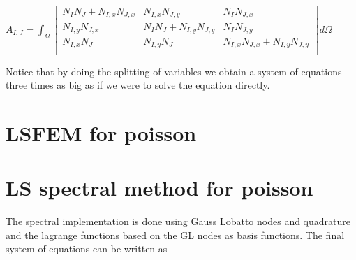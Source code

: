 $A_{I,J} = \int_{\Omega}
\begin{bmatrix}
	N_IN_J + N_{I,x}N_{J,x} & N_{I,x}N_{J,y} & N_IN_{J,x} \\ 	
	N_{I,y}N_{J,x} &N_IN_J + N_{I,y}N_{J,y} &  N_IN_{J,y} \\ 	
	N_{I,x}N_J & N_{I,y}N_J & N_{I,x}N_{J,x} + N_{I,y}N_{J,y} \\ 	
\end{bmatrix}
d\Omega$

Notice that by doing the splitting of variables we obtain a system of equations three times as big as if we were to solve the equation directly. 

\section{LSFEM for poisson}
\section{LS spectral method for poisson}



The spectral implementation is done using Gauss Lobatto nodes and quadrature and the lagrange functions based on the GL nodes as basis functions. 
The final system of equations can be written as 
